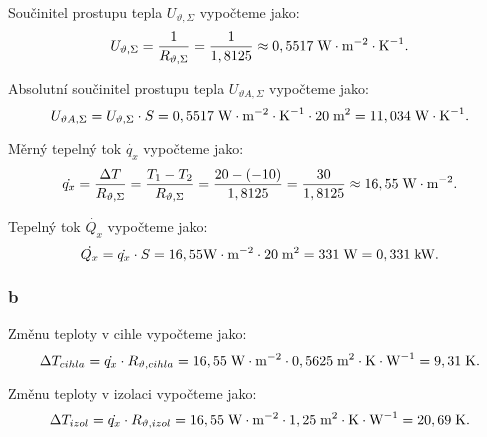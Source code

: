 \documentclass{article}
\begin{document}
Součinitel prostupu tepla $U_{\vartheta,\Sigma}$ vypočteme jako:
$$
    U_{\vartheta,\Sigma} = \frac{1}{R_{\vartheta,\Sigma}} = \frac{1}{1,8125} \approx 0,5517 \; \textrm{W} \cdot \textrm{m}^{-2} \cdot \textrm{K}^{-1}.
$$

Absolutní součinitel prostupu tepla $U_{\vartheta A,\Sigma}$ vypočteme jako:
$$
    U_{\vartheta A,\Sigma} = U_{\vartheta,\Sigma} \cdot S = 0,5517 \; \textrm{W} \cdot \textrm{m}^{-2} \cdot \textrm{K}^{-1} \cdot 20 \; \textrm{m}^{\textrm{2}} = 11,034 \; \textrm{W} \cdot \textrm{K}^{-1}.
$$

Měrný tepelný tok $\dot{q_x}$ vypočteme jako:
$$
    \dot{q_x} = \frac{\Delta T}{R_{\vartheta,\Sigma}} = \frac{T_1 - T_2}{R_{\vartheta,\Sigma}} = \frac{20 - (-10)}{1,8125} = \frac{30}{1,8125} \approx 16,55 \; \textrm{W} \cdot \textrm{m}^{-2}.
$$

Tepelný tok $\dot{Q_x}$ vypočteme jako:
$$
    \dot{Q_x} = \dot{q_x} \cdot S = 16,55 \textrm{W} \cdot \textrm{m}^{-2} \cdot 20 \; \textrm{m}^{\textrm{2}} = 331 \; \textrm{W} = 0,331 \; \textrm{kW}.
$$


\subsubsection{b}
Změnu teploty v cihle vypočteme jako:
$$
    \Delta T_{cihla} = \dot{q_x} \cdot R_{\vartheta,cihla} = 16,55 \; \textrm{W} \cdot \textrm{m}^{-2} \cdot 0,5625 \; \textrm{m}^{\textrm{2}} \cdot \textrm{K} \cdot \textrm{W}^{-1} = 9,31 \; \textrm{K}.
$$

Změnu teploty v izolaci vypočteme jako:
$$
    \Delta T_{izol} = \dot{q_x} \cdot R_{\vartheta,izol} = 16,55 \; \textrm{W} \cdot \textrm{m}^{-2} \cdot 1,25 \; \textrm{m}^{\textrm{2}} \cdot \textrm{K} \cdot \textrm{W}^{-1} = 20,69 \; \textrm{K}.
$$
\end{document}
